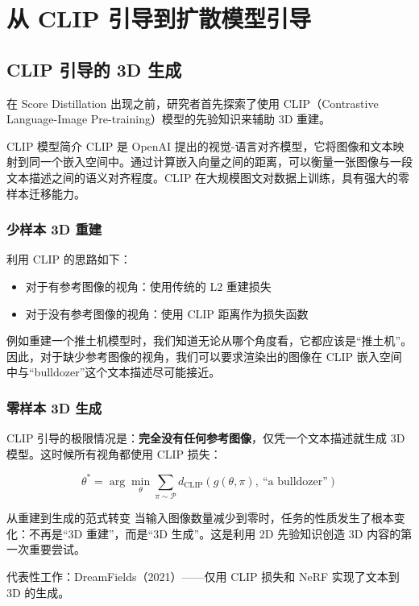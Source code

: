\section{从 CLIP 引导到扩散模型引导}

\subsection{CLIP 引导的 3D 生成}

在 Score Distillation 出现之前，研究者首先探索了使用 CLIP（Contrastive Language-Image Pre-training）模型的先验知识来辅助 3D 重建。

\begin{knowledgebox}{CLIP 模型简介}
CLIP 是 OpenAI 提出的视觉-语言对齐模型，它将图像和文本映射到同一个嵌入空间中。通过计算嵌入向量之间的距离，可以衡量一张图像与一段文本描述之间的语义对齐程度。CLIP 在大规模图文对数据上训练，具有强大的零样本迁移能力。
\end{knowledgebox}

\subsubsection{少样本 3D 重建}

利用 CLIP 的思路如下：
\begin{itemize}
    \item 对于有参考图像的视角：使用传统的 L2 重建损失
    \item 对于没有参考图像的视角：使用 CLIP 距离作为损失函数
\end{itemize}

例如重建一个推土机模型时，我们知道无论从哪个角度看，它都应该是``推土机''。因此，对于缺少参考图像的视角，我们可以要求渲染出的图像在 CLIP 嵌入空间中与``bulldozer''这个文本描述尽可能接近。

\subsubsection{零样本 3D 生成}

CLIP 引导的极限情况是：\textbf{完全没有任何参考图像}，仅凭一个文本描述就生成 3D 模型。这时候所有视角都使用 CLIP 损失：

$$
\theta^* = \arg\min_{\theta} \sum_{\pi \sim \mathcal{P}} d_{\text{CLIP}}(g(\theta, \pi),\ \text{``a bulldozer''})
$$

\begin{importantbox}{从重建到生成的范式转变}
当输入图像数量减少到零时，任务的性质发生了根本变化：不再是``3D 重建''，而是``3D 生成''。这是利用 2D 先验知识创造 3D 内容的第一次重要尝试。

代表性工作：DreamFields（2021）——仅用 CLIP 损失和 NeRF 实现了文本到 3D 的生成。
\end{importantbox}

